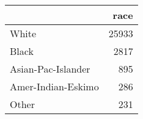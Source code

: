 \begin{tabular}{lr}
\toprule
{} &   race \\
\midrule
 White              &  25933 \\
 Black              &   2817 \\
 Asian-Pac-Islander &    895 \\
 Amer-Indian-Eskimo &    286 \\
 Other              &    231 \\
\bottomrule
\end{tabular}

